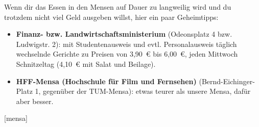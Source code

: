 Wenn dir das Essen in den Mensen auf Dauer zu langweilig wird und du trotzdem nicht viel Geld ausgeben willst, hier ein paar Geheimtipps:

\begin{itemize}
	\item \textbf{Finanz- bzw. Landwirtschaftsministerium} (Odeonsplatz 4 bzw. Ludwigstr. 2): mit Studentenausweis und evtl. Personalausweis täglich wechselnde Gerichte zu Preisen von 3,90~€ bis 6,00~€, jeden Mittwoch Schnitzeltag (4,10~€ mit Salat und Beilage).
	
	\item \textbf{HFF-Mensa (Hochschule für Film und Fernsehen)}
          (Bernd-Eichinger-Platz 1, gegenüber der TUM-Mensa): etwas
          teurer als unsere Mensa, dafür aber besser.
\end{itemize}

\begin{urlList}
	[mensa]
\end{urlList}

